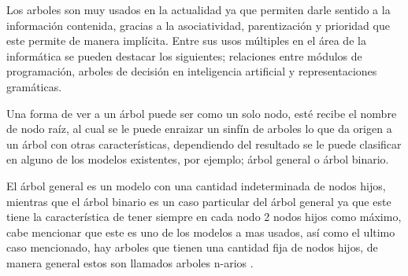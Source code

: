 Los arboles son muy usados en la actualidad ya que permiten  darle sentido a
 la informaci\'on contenida, gracias a la asociatividad, parentizaci\'on y
 prioridad que este permite de manera impl\'icita. Entre sus usos m\'ultiples en
 el \'area de la inform\'atica se pueden destacar los  siguientes; relaciones
 entre m\'odulos de programaci\'on, arboles de decisi\'on en inteligencia artificial
 y representaciones gram\'aticas\cite{gutierrez1999estructuras}.  

Una forma de ver a un \'arbol puede ser como un solo nodo, est\'e recibe el nombre
 de  nodo ra\'iz, al cual se le puede enraizar un sinf\'in de arboles lo que da
 origen  a un \'arbol con otras caracter\'isticas, dependiendo del resultado se le
 puede clasificar en alguno de los modelos existentes, por ejemplo; \'arbol 
 general o \'arbol binario\cite{gutierrez1999estructuras}. 

El \'arbol general es un modelo con una cantidad indeterminada de nodos hijos,
 mientras que el \'arbol binario es un caso particular del \'arbol general ya que
 este tiene la caracter\'istica de tener siempre en cada nodo 2 nodos hijos como
 m\'aximo, cabe mencionar que este es uno de los modelos a mas usados, as\'i como
 el ultimo caso mencionado, hay arboles que tienen una cantidad fija de nodos
 hijos, de manera general estos son llamados arboles n-arios
 \cite{gutierrez1999estructuras}.
